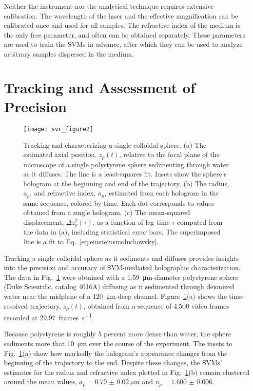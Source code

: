 Neither the instrument nor the analytical technique requires
extensive calibration.
The wavelength of the laser and the effective magnification can be
calibrated once and used for all samples.
The refractive index of the medium is the only free parameter, 
and often can be obtained separately.
These parameters are used to train the SVMs in advance,
after which they can be used to analyze arbitrary samples
dispersed in the medium.

\section{Tracking and Assessment of Precision}

\begin{figure}
  \centering
  \texttt{[image: svr\_figure2]}
  \caption{Tracking and characterizing a single colloidal sphere.
    (a) The estimated axial position, $z_p(t)$, relative to the focal plane
    of the microscope of a single polystyrene sphere sedimenting
    through water as it diffuses.  The line is a least-squares fit.
    Insets show the sphere's hologram at the beginning and end
    of the trajectory.
    (b) The radius, $a_p$, and refractive index, $n_p$,
    estimated from each hologram in the same sequence, colored
    by time.  Each dot corresponds to values obtained from a single
    hologram.
    (c) The mean-squared displacement, $\Delta z_p^2(\tau)$, as a function
    of lag time $\tau$ computed from the data in (a), including
    statistical error bars.  The superimposed line is a fit to
    Eq.~\eqref{eq:einsteinsmoluchowsky}.\cite{yevick14}}
  \label{fig:values}
\end{figure}

Tracking a single colloidal sphere as it sediments and diffuses
provides insights into
the precision and accuracy of SVM-mediated holographic characterization.
The data in Fig.~\ref{fig:values} were obtained with
a \SI{1.59}{\um}-diameter
polystyrene sphere (Duke Scientific, catalog 4016A)
diffusing as it sedimented through
deionized water near the midplane of
a \SI{120}{\um}-deep channel.
Figure~\ref{fig:values}(a) shows the time-resolved
trajectory, $z_p(t)$, obtained from a sequence of \num{4,500} video frames
recorded at \SI{29.97}{frames\per\second}.

Because polystyrene is roughly 5 percent more dense than water,
the sphere sediments
more that \SI{10}{\um} over the
course of the experiment.
The insets to Fig.~\ref{fig:values}(a) show how markedly
the hologram's appearance changes from the beginning
of the trajectory to the end.
Despite these changes, the SVMs' estimates for the
radius and refractive index plotted in Fig.~\ref{fig:values}(b)
remain clustered around the mean values,
$a_p = \SI{0.79(2)}{\um}$
and 
$n_p = \num{1.600(6)}$.

